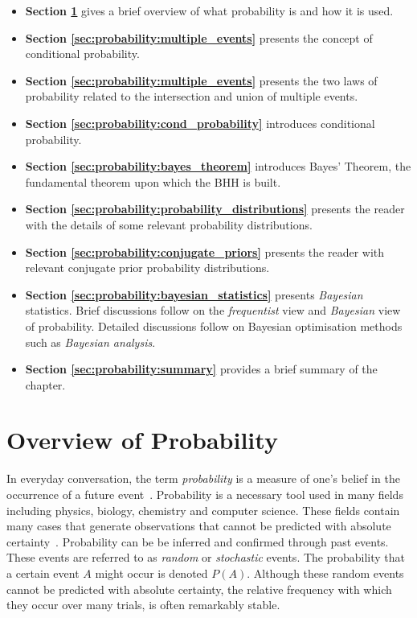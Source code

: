 \begin{itemize}
      \item \textbf{Section \ref{sec:probability:overview}} gives a brief overview of what probability is and how it is used.

      \item \textbf{Section \ref{sec:probability:multiple_events}} presents the concept of conditional probability.

      \item \textbf{Section \ref{sec:probability:multiple_events}} presents the two laws of probability related to the intersection and union of multiple events.

      \item \textbf{Section \ref{sec:probability:cond_probability}} introduces conditional probability.

      \item \textbf{Section \ref{sec:probability:bayes_theorem}} introduces Bayes' Theorem, the fundamental theorem upon which the \acs{BHH} is built.

      \item \textbf{Section \ref{sec:probability:probability_distributions}} presents the reader with the details of some relevant probability distributions.

      \item \textbf{Section \ref{sec:probability:conjugate_priors}} presents the reader with relevant conjugate prior probability distributions.

      \item \textbf{Section \ref{sec:probability:bayesian_statistics}} presents \textit{Bayesian} statistics. Brief discussions follow on the \textit{frequentist} view and \textit{Bayesian} view of probability. Detailed discussions follow on Bayesian optimisation methods such as \textit{Bayesian analysis}.

      \item \textbf{Section \ref{sec:probability:summary}} provides a brief summary of the chapter.
\end{itemize}


\section{Overview of Probability}\label{sec:probability:overview}

In everyday conversation, the term \textit{probability} is a measure of one's belief in the occurrence of a future event~\cite{ref:wackerly:2014}. Probability is a necessary tool used in many fields including physics, biology, chemistry and computer science. These fields contain many cases that generate observations that cannot be predicted with absolute certainty~\cite{ref:wackerly:2014}. Probability can be be inferred and confirmed through past events. These events are referred to as \textit{random} or \textit{stochastic} events. The probability that a certain event $A$ might occur is denoted $P(A)$. Although these random events cannot be predicted with absolute certainty, the relative frequency with which they occur over many trials, is often remarkably stable.

